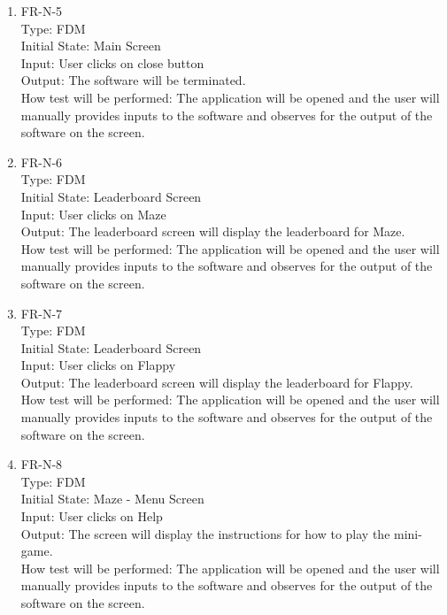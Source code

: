\documentclass[12pt, titlepage]{article}
\begin{document}
\begin{enumerate}
\item{FR-N-5\\}
Type: FDM\\
Initial State: Main Screen\\
Input: User clicks on close button\\
Output: The software will be terminated.\\
How test will be performed: The application will be opened and the user will manually provides inputs to the software and observes for the output of the software on the screen.\\

\item{FR-N-6\\}
Type: FDM\\
Initial State: Leaderboard Screen\\
Input: User clicks on Maze\\
Output: The leaderboard screen will display the leaderboard for Maze.\\
How test will be performed: The application will be opened and the user will manually provides inputs to the software and observes for the output of the software on the screen.\\

\item{FR-N-7\\}
Type: FDM\\
Initial State: Leaderboard Screen\\
Input: User clicks on Flappy\\
Output: The leaderboard screen will display the leaderboard for Flappy.\\
How test will be performed: The application will be opened and the user will manually provides inputs to the software and observes for the output of the software on the screen.\\

\item{FR-N-8\\}
Type: FDM\\
Initial State: Maze - Menu Screen\\
Input: User clicks on Help\\
Output: The screen will display the instructions for how to play the mini-game.\\
How test will be performed: The application will be opened and the user will manually provides inputs to the software and observes for the output of the software on the screen.\\


\end{enumerate}
\end{document}

